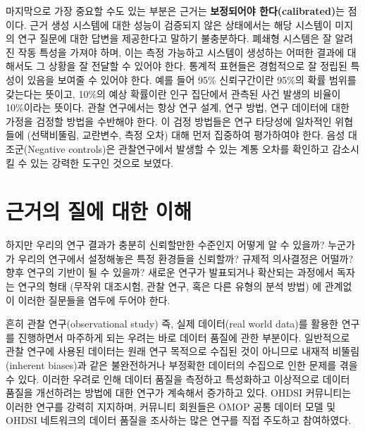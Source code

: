 \documentclass[11pt]{book}
\theoremstyle{definition}
\theoremstyle{definition}
\theoremstyle{definition}
\theoremstyle{remark}
\begin{document}
마지막으로 가장 중요할 수도 있는 부분은 근거는 \textbf{보정되어야
한다(calibrated)}는 점이다. 근거 생성 시스템에 대한 성능이 검증되지 않은
상태에서는 해당 시스템이 미지의 연구 질문에 대한 답변을 제공한다고
말하기 불충분하다. 폐쇄형 시스템은 잘 알려진 작동 특성을 가져야 하며,
이는 측정 가능하고 시스템이 생성하는 어떠한 결과에 대해서도 그 상황을 잘
전달할 수 있어야 한다. 통계적 표현들은 경험적으로 잘 정립된 특성이
있음을 보여줄 수 있어야 한다. 예를 들어 95\% 신뢰구간이란 95\%의 확률
범위를 갖는다는 뜻이고, 10\%의 예상 확률이란 인구 집단에서 관측된 사건
발생의 비율이 10\%이라는 뜻이다. 관찰 연구에서는 항상 연구 설계, 연구
방법, 연구 데이터에 대한 가정을 검정할 방법을 수반해야 한다. 이 검정
방법들은 연구 타당성에 일차적인 위협들에 (선택비뚤림, 교란변수, 측정
오차) 대해 먼저 집중하여 평가하여야 한다. 음성 대조군(Negative
controls)은 관찰연구에서 발생할 수 있는 계통 오차를 확인하고 감소시킬 수
있는 강력한 도구인 것으로 보였다.
\citep{schuemie_2016, schuemie_2018, schuemie_2018b}

\section{근거의 질에 대한 이해}\label{---}

하지만 우리의 연구 결과가 충분히 신뢰할만한 수준인지 어떻게 알 수
있을까? 누군가가 우리의 연구에서 설정해놓은 특정 환경들을 신뢰할까?
규제적 의사결정은 어떨까? 향후 연구의 기반이 될 수 있을까? 새로운 연구가
발표되거나 확산되는 과정에서 독자는 연구의 형태 (무작위 대조시험, 관찰
연구, 혹은 다른 유형의 분석 방법) 에 관계없이 이러한 질문들을 염두에
두어야 한다.  

흔히 관찰 연구(observational study) 즉, 실제 데이터(real world data)를
활용한 연구를 진행하면서 마주하게 되는 우려는 바로 데이터 품질에 관한
부분이다. \citep{botsis2010secondary, hersh2013caveats, sherman2016real}
일반적으로 관찰 연구에 사용된 데이터는 원래 연구 목적으로 수집된 것이
아니므로 내재적 비뚤림(inherent biases)과 같은 불완전하거나 부정확한
데이터의 수집으로 인한 문제를 겪을 수 있다. 이러한 우려로 인해 데이터
품질을 측정하고 특성화하고 이상적으로 데이터 품질을 개선하려는 방법에
대한 연구가 계속해서 증가하고 있다.
\citep{kahn2012pragmatic, liaw2013towards, weiskopf_2013} OHDSI
커뮤니티는 이러한 연구를 강력히 지지하며, 커뮤니티 회원들은 OMOP 공통
데이터 모델 및 OHDSI 네트워크의 데이터 품질을 조사하는 많은 연구를 직접
주도하고 참여하였다.
\citep{huser_multisite_2016, kahn_transparent_2015, callahan2017comparison, yoon_2016}
 
\end{document}
